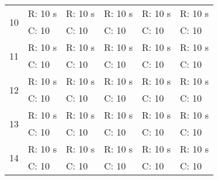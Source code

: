 \begin{table}[H]
\begin{tabular}{|c|l||l||l||l||l|}
        \multirow{2}{*}{10}     & R: 10 s                          & R: 10 s                          & R: 10 s                        & R: 10 s                         & R: 10 s                        \\ \cline{2-6}
                               & C: 10                            & C: 10                            & C: 10                          & C: 10                           & C: 10                          \\ \hline\hline

        \multirow{2}{*}{11}     & R: 10 s                          & R: 10 s                          & R: 10 s                        & R: 10 s                         & R: 10 s                        \\ \cline{2-6}
                               & C: 10                            & C: 10                            & C: 10                          & C: 10                           & C: 10                          \\ \hline\hline

        \multirow{2}{*}{12}     & R: 10 s                          & R: 10 s                          & R: 10 s                        & R: 10 s                         & R: 10 s                        \\ \cline{2-6}
                               & C: 10                            & C: 10                            & C: 10                          & C: 10                           & C: 10                          \\ \hline\hline
        \multirow{2}{*}{13}     & R: 10 s                          & R: 10 s                          & R: 10 s                        & R: 10 s                         & R: 10 s                        \\ \cline{2-6}
                               & C: 10                            & C: 10                            & C: 10                          & C: 10                           & C: 10                          \\ \hline\hline

        \multirow{2}{*}{14}     & R: 10 s                          & R: 10 s                          & R: 10 s                        & R: 10 s                         & R: 10 s                        \\ \cline{2-6}
                               & C: 10                            & C: 10                            & C: 10                          & C: 10                           & C: 10                          \\ \hline\hline


\end{tabular}
\end{table}

